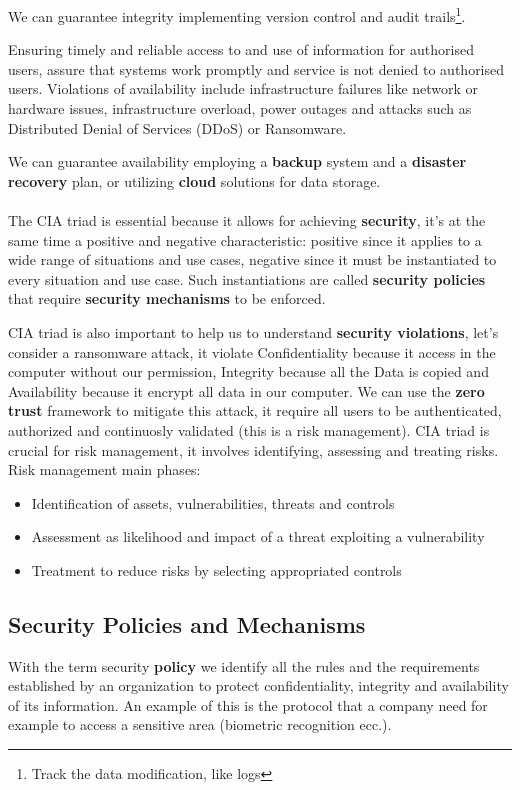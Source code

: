     We can guarantee integrity implementing version control and audit trails\footnote{Track the data modification, like logs}.
    
    Ensuring timely and reliable access to and use of information for authorised users, assure that systems work promptly and service is not denied to authorised users. Violations of availability include infrastructure failures like network or hardware issues, infrastructure overload, power outages and attacks such as Distributed Denial of Services (DDoS) or Ransomware.
    
    We can guarantee availability employing a \textbf{backup} system and a \textbf{disaster recovery} plan, or utilizing \textbf{cloud} solutions for data storage.
    \\\\
    The CIA triad is essential because it allows for achieving \textbf{security}, it's at the same time a positive and negative characteristic: positive since it applies to a wide range of situations and use cases, negative since it must be instantiated to every situation and use case. Such instantiations are called \textbf{security policies} that require \textbf{security mechanisms} to be enforced.
    
    CIA triad is also important to help us to understand \textbf{security violations}, let's consider a ransomware attack, it violate Confidentiality because it access in the computer without our permission, Integrity because all the Data is copied and Availability because it encrypt all data in our computer. We can use the \textbf{zero trust} framework to mitigate this attack, it require all users to be authenticated, authorized and continuosly validated (this is a risk management). CIA triad is crucial for risk management, it involves identifying, assessing and treating risks.
    Risk management main phases:
    \begin{itemize}
        \item Identification of assets, vulnerabilities, threats and controls
        \item Assessment as likelihood and impact of a threat exploiting a vulnerability
        \item Treatment to reduce risks by selecting appropriated controls
    \end{itemize}   
    
    \subsection{Security Policies and Mechanisms}
    With the term security \textbf{policy} we identify all the rules and the requirements established by an organization to protect confidentiality, integrity and availability of its information. An example of this is the protocol that a company need for example to access a sensitive area (biometric recognition ecc.).
    
